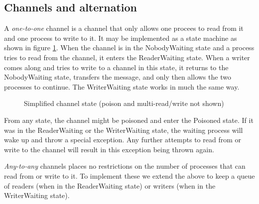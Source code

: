 \documentclass[a4paper,12pt]{article}
\begin{document}
\subsection{Channels and alternation}
A \emph{one-to-one} channel is a channel that only allows one procees to read from it
and one process 
to write to it. It may be implemented as a state machine as shown in figure \ref{channel-state}.
When the channel is in the NobodyWaiting state and a process tries to read from the channel,
it enters the ReaderWaiting state. When a writer comes along and tries to write to a channel
in this state, it returns to the NobodyWaiting state, transfers the message, and only then
allows the two processes to continue. The WriterWaiting state works in much the same way.

\begin{figure}[h]
\centering
\caption{Simplified channel state (poison and multi-read/write not shown)}
\label{channel-state}
\end{figure}

From any state, the channel might be poisoned and enter the Poisoned state. If it was in the
ReaderWaiting or the WriterWaiting state, the waiting process will wake up and throw a special
exception. Any further attempts to read from or write to the channel will result in this 
exception being thrown again.

\emph{Any-to-any} channels places no restrictions on the number of processes that can
read from or write to it. To implement these we extend the above to keep a queue
of readers (when in the ReaderWaiting state) or writers (when in the
WriterWaiting state).
\end{document}
